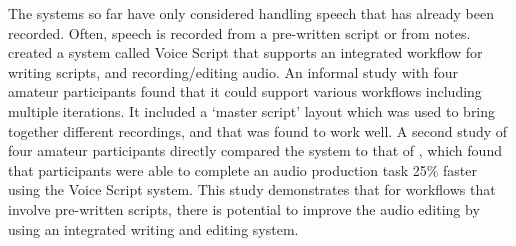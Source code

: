The systems so far have only considered handling speech that has already been recorded. Often, speech is recorded from
a pre-written script or from notes. \citet{Shin2016} created a system called Voice Script that supports an
integrated workflow for writing scripts, and recording/editing audio. An informal study with four amateur participants
found that it could support various workflows including multiple iterations. It included a `master script' layout
which was used to bring together different recordings,  and that was found to work well.  A second study of four
amateur participants directly compared the system to that of \citet{Rubin2013}, which found that participants were able
to complete an audio production task 25\% faster using the Voice Script system.  This study demonstrates that for
workflows that involve pre-written scripts, there is potential to improve the audio editing by using an integrated
writing and editing system.






